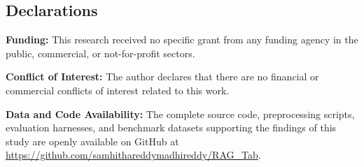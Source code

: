 \documentclass[sn-basic]{sn-jnl}
\begin{document}
\begin{backmatter}
\section*{Declarations}

\textbf{Funding:} This research received no specific grant from any funding agency in the public, commercial, or not-for-profit sectors.

\textbf{Conflict of Interest:} The author declares that there are no financial or commercial conflicts of interest related to this work.

\textbf{Data and Code Availability:} The complete source code, preprocessing scripts, evaluation harnesses, and benchmark datasets supporting the findings of this study are openly available on GitHub at \url{https://github.com/samhithareddymadhireddy/RAG_Tab}.

\end{backmatter}


\end{document}
